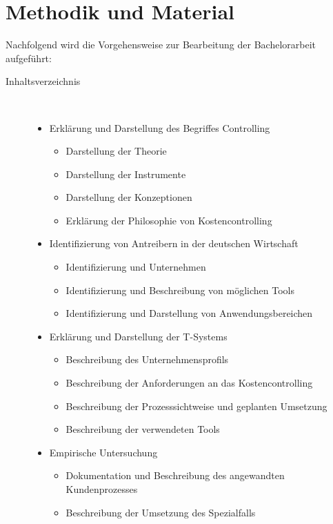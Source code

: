 
\chapter{Methodik und Material}
\label{ch:Methodik}

Nachfolgend wird die Vorgehensweise zur Bearbeitung der Bachelorarbeit aufgeführt: 
\begin{center}
\begin{description}
\item[Inhaltsverzeichnis]~\par
\begin{itemize}
	\item Erklärung und Darstellung des Begriffes Controlling
	\begin{itemize}
		\item Darstellung der Theorie
		\item Darstellung der Instrumente
		\item Darstellung der Konzeptionen
		\item Erklärung der Philosophie von Kostencontrolling
	\end{itemize}
	\item Identifizierung von Antreibern in der deutschen Wirtschaft
	\begin{itemize}
		\item Identifizierung und Unternehmen
		\item Identifizierung und Beschreibung von möglichen Tools
		\item Identifizierung und Darstellung von Anwendungsbereichen
	\end{itemize}
	\item Erklärung und Darstellung der T-Systems
	\begin{itemize}
		\item Beschreibung des Unternehmensprofils
		\item Beschreibung der Anforderungen an das Kostencontrolling
		\item Beschreibung der Prozesssichtweise und geplanten Umsetzung
		\item Beschreibung der verwendeten Tools
	\end{itemize}
	\item Empirische Untersuchung
	\begin{itemize}
		\item Dokumentation und Beschreibung des angewandten Kundenprozesses
		\item Beschreibung der Umsetzung des Spezialfalls

\end{itemize}
\end{itemize}
\end{description}
\end{center}
